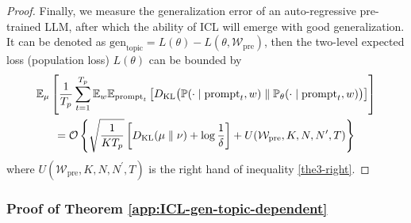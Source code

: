 \begin{proof}
	Finally, we measure the generalization error of an auto-regressive pre-trained LLM, after which the ability of ICL will emerge with good generalization. It can be denoted as $\text{gen}_\text{topic}=L(\theta)-L(\theta,\mathcal{W}_{\text{pre}})$, then the two-level expected loss (population loss) $L(\theta)$ can be bounded by
	\begin{multline}
		\mathbb{E}_{\mu}\left[\frac{1}{T_p}\sum_{t=1}^{T_p}\mathbb{E}_{w}\mathbb{E}_{\text{prompt}_{t}}\left[D_{\mathrm{KL}}\big(\mathbb{P}(\cdot\mid \text{prompt}_{t},w)\parallel \mathbb{P}_{\theta}(\cdot\mid \text{prompt}_{t},w)\big)\right] \right]\\
		=\mathcal{O}\left\{\sqrt{\frac{1}{KT_p}}\left[D_{\mathrm{KL}}(\mu\parallel \nu)+\log \frac{1}{\delta}\right]+U(\mathcal{W}_{\text{pre}},K,N,N^\prime,T)\right\}
	\end{multline}
	where $U(\mathcal{W}_{\text{pre}},K,N,N^\prime,T)$ is the right hand of inequality \ref{the3-right}.
\end{proof}

\subsubsection{Proof of Theorem \ref{app:ICL-gen-topic-dependent}}\label{appendix-the-4}

